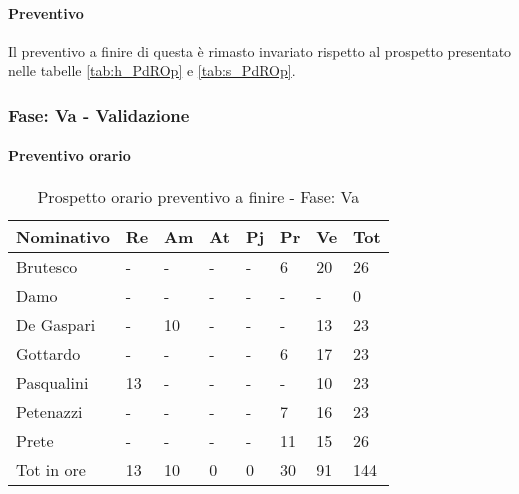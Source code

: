 			\paragraph{Preventivo} Il preventivo a finire di questa  è rimasto invariato rispetto al prospetto presentato nelle tabelle \ref{tab:h_PdROp} e \ref{tab:s_PdROp}.
		\newpage
		\subsubsection {Fase: Va - Validazione}
			\paragraph{Preventivo orario}
			\begin{table}[H] \begin{center} \begin{tabular}{llllllll}
										\toprule
										\textbf{Nominativo}	&	\textbf{Re}	&	\textbf{Am}	&	\textbf{At}	&	\textbf{Pj}	&	\textbf{Pr}	&	\textbf{Ve}	&	\textbf{Tot}	 \\
										\midrule
										Brutesco	&	-	&	-	&	-	&	-	&	6	&	20	&	26	 \\
										Damo	&	-	&	-	&	-	&	-	&	-	&	-	&	0	 \\
										De Gaspari	&	-	&	10	&	-	&	-	&	-	&	13	&	23	 \\
										Gottardo	&	-	&	-	&	-	&	-	&	6	&	17	&	23	 \\
										Pasqualini	&	13	&	-	&	-	&	-	&	-	&	10	&	23	 \\
										Petenazzi	&	-	&	-	&	-	&	-	&	7	&	16	&	23	 \\
										Prete	&	-	&	-	&	-	&	-	&	11	&	15	&	26	 \\
										\midrule
										Tot in ore	&	13	&	10	&	0	&	0	&	30	&	91	&	144	 \\


										\bottomrule
										\end{tabular} \end{center} \caption{Prospetto orario preventivo a finire - Fase:
										Va
										}\end{table}
